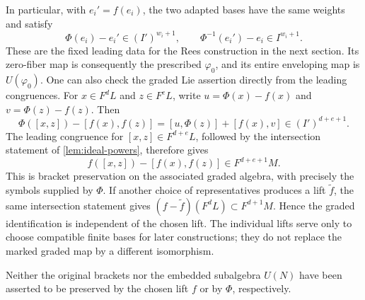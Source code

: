 In particular, with \(e_i'=f(e_i)\), the two adapted bases have
the same weights and satisfy
\begin{equation}\label{eq:matched-leading-bases}
 \Phi(e_i)-e_i'\in(I')^{w_i+1},\qquad
 \Phi^{-1}(e_i')-e_i\in I^{w_i+1}.
\end{equation}
These are the fixed leading data for the Rees construction in the
next section. Its zero-fiber map is consequently the prescribed
\(\varphi_0\), and its entire enveloping map is \(U(\varphi_0)\).
One can also check the graded Lie assertion directly from the leading
congruences. For \(x\in F^dL\) and \(z\in F^eL\), write
\(u=\Phi(x)-f(x)\) and \(v=\Phi(z)-f(z)\). Then
\[
 \Phi([x,z])-[f(x),f(z)]
   =[u,\Phi(z)]+[f(x),v]\in(I')^{d+e+1}.
\]
The leading congruence for \([x,z]\in F^{d+e}L\), followed by
the intersection statement of \cref{lem:ideal-powers}, therefore gives
\[
 f([x,z])-[f(x),f(z)]\in F^{d+e+1}M.
\]
This is bracket preservation on the associated graded algebra,
with precisely the symbols supplied by \(\Phi\).
If another choice of representatives produces a lift \(\widetilde f\),
the same intersection statement gives
\((f-\widetilde f)(F^dL)\subset F^{d+1}M\).
Hence the graded identification is independent of the chosen lift.
The individual lifts serve only to choose compatible finite bases
for later constructions; they do not replace the marked graded map
by a different isomorphism.

Neither the original brackets nor the embedded subalgebra \(U(N)\)
have been asserted to be preserved by the chosen lift \(f\) or by
\(\Phi\), respectively.
